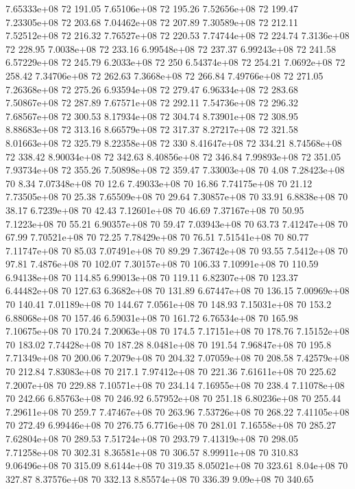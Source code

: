7.65333e+08 72 191.05
7.65106e+08 72 195.26
7.52656e+08 72 199.47
7.23305e+08 72 203.68
7.04462e+08 72 207.89
7.30589e+08 72 212.11
7.52512e+08 72 216.32
7.76527e+08 72 220.53
7.74744e+08 72 224.74
7.3136e+08 72 228.95
7.0038e+08 72 233.16
6.99548e+08 72 237.37
6.99243e+08 72 241.58
6.57229e+08 72 245.79
6.2033e+08 72 250
6.54374e+08 72 254.21
7.0692e+08 72 258.42
7.34706e+08 72 262.63
7.3668e+08 72 266.84
7.49766e+08 72 271.05
7.26368e+08 72 275.26
6.93594e+08 72 279.47
6.96334e+08 72 283.68
7.50867e+08 72 287.89
7.67571e+08 72 292.11
7.54736e+08 72 296.32
7.68567e+08 72 300.53
8.17934e+08 72 304.74
8.73901e+08 72 308.95
8.88683e+08 72 313.16
8.66579e+08 72 317.37
8.27217e+08 72 321.58
8.01663e+08 72 325.79
8.22358e+08 72 330
8.41647e+08 72 334.21
8.74568e+08 72 338.42
8.90034e+08 72 342.63
8.40856e+08 72 346.84
7.99893e+08 72 351.05
7.93734e+08 72 355.26
7.50898e+08 72 359.47
7.33003e+08 70 4.08
7.28423e+08 70 8.34
7.07348e+08 70 12.6
7.49033e+08 70 16.86
7.74175e+08 70 21.12
7.73505e+08 70 25.38
7.65509e+08 70 29.64
7.30857e+08 70 33.91
6.8838e+08 70 38.17
6.7239e+08 70 42.43
7.12601e+08 70 46.69
7.37167e+08 70 50.95
7.1223e+08 70 55.21
6.90357e+08 70 59.47
7.03943e+08 70 63.73
7.41247e+08 70 67.99
7.70521e+08 70 72.25
7.78429e+08 70 76.51
7.51541e+08 70 80.77
7.11747e+08 70 85.03
7.07491e+08 70 89.29
7.36742e+08 70 93.55
7.5412e+08 70 97.81
7.4876e+08 70 102.07
7.30157e+08 70 106.33
7.10991e+08 70 110.59
6.94138e+08 70 114.85
6.99013e+08 70 119.11
6.82307e+08 70 123.37
6.44482e+08 70 127.63
6.3682e+08 70 131.89
6.67447e+08 70 136.15
7.00969e+08 70 140.41
7.01189e+08 70 144.67
7.0561e+08 70 148.93
7.15031e+08 70 153.2
6.88068e+08 70 157.46
6.59031e+08 70 161.72
6.76534e+08 70 165.98
7.10675e+08 70 170.24
7.20063e+08 70 174.5
7.17151e+08 70 178.76
7.15152e+08 70 183.02
7.74428e+08 70 187.28
8.0481e+08 70 191.54
7.96847e+08 70 195.8
7.71349e+08 70 200.06
7.2079e+08 70 204.32
7.07059e+08 70 208.58
7.42579e+08 70 212.84
7.83083e+08 70 217.1
7.97412e+08 70 221.36
7.61611e+08 70 225.62
7.2007e+08 70 229.88
7.10571e+08 70 234.14
7.16955e+08 70 238.4
7.11078e+08 70 242.66
6.85763e+08 70 246.92
6.57952e+08 70 251.18
6.80236e+08 70 255.44
7.29611e+08 70 259.7
7.47467e+08 70 263.96
7.53726e+08 70 268.22
7.41105e+08 70 272.49
6.99446e+08 70 276.75
6.7716e+08 70 281.01
7.16558e+08 70 285.27
7.62804e+08 70 289.53
7.51724e+08 70 293.79
7.41319e+08 70 298.05
7.71258e+08 70 302.31
8.36581e+08 70 306.57
8.99911e+08 70 310.83
9.06496e+08 70 315.09
8.6144e+08 70 319.35
8.05021e+08 70 323.61
8.04e+08 70 327.87
8.37576e+08 70 332.13
8.85574e+08 70 336.39
9.09e+08 70 340.65
